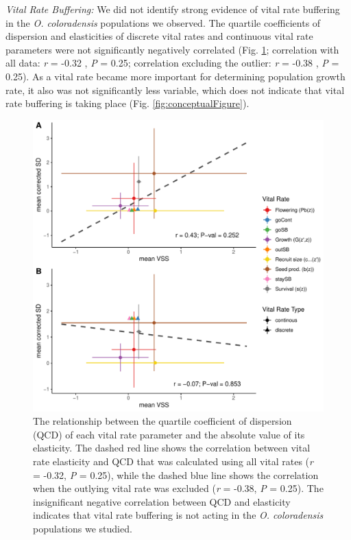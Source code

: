 \documentclass[12pt, letterpaper]{article}
\begin{document}
\textit{Vital Rate Buffering:} We did not identify strong evidence of vital rate buffering in the \textit{O. coloradensis} populations we observed. The quartile coefficients of dispersion and elasticities of discrete vital rates and continuous vital rate parameters were not significantly negatively correlated (Fig. \ref{fig:VRBuffering}; correlation with all data: \textit{r} = -0.32 , \textit{P} = 0.25; correlation excluding the outlier: \textit{r} = -0.38 , \textit{P} = 0.25). As a vital rate became more important for determining population growth rate, it also was not significantly less variable, which does not indicate that vital rate buffering is taking place (Fig. \ref{fig:conceptualFigure}).  

\begin{figure}[h]
  \centering
  \includegraphics[width=.7\textwidth]{figures/VRbufferingFigure.pdf}
  \caption{The relationship between the quartile coefficient of dispersion (QCD) of each vital rate parameter and the absolute value of its elasticity. The dashed red line shows the correlation between vital rate elasticity and QCD that was calculated using all vital rates (\textit{r} = -0.32, \textit{P} = 0.25), while the dashed blue line shows the correlation when the outlying vital rate was excluded (\textit{r} = -0.38, \textit{P} = 0.25). The insignificant negative correlation between QCD and elasticity indicates that vital rate buffering is not acting in the \textit{O. coloradensis} populations we studied.}
  \label{fig:VRBuffering}
\end{figure} 
\end{document}
